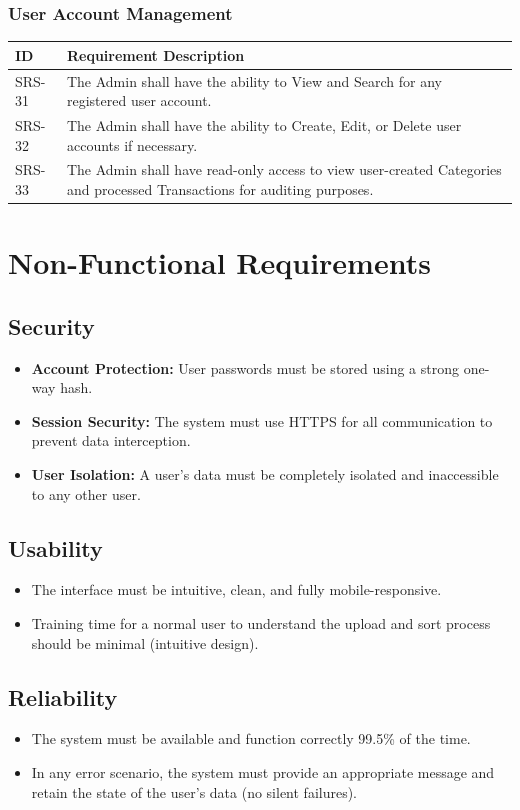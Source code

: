 \documentclass[11pt,a4paper]{report}
\begin{document}
\subsubsection{User Account Management}
\begin{longtable}{|p{2.5cm}|p{12cm}|}
	\hline
	\textbf{ID} & \textbf{Requirement Description} \\
	\hline
	SRS-31 & The Admin shall have the ability to View and Search for any registered user account. \\ \hline
	SRS-32 & The Admin shall have the ability to Create, Edit, or Delete user accounts if necessary. \\ \hline
	SRS-33 & The Admin shall have read-only access to view user-created Categories and processed Transactions for auditing purposes. \\ \hline
\end{longtable}

\section{Non-Functional Requirements}

\subsection{Security}
\begin{itemize}
	\item \textbf{Account Protection:} User passwords must be stored using a strong one-way hash.
	\item \textbf{Session Security:} The system must use HTTPS for all communication to prevent data interception.
	\item \textbf{User Isolation:} A user's data must be completely isolated and inaccessible to any other user.
\end{itemize}

\subsection{Usability}
\begin{itemize}
	\item The interface must be intuitive, clean, and fully mobile-responsive.
	\item Training time for a normal user to understand the upload and sort process should be minimal (intuitive design).
\end{itemize}

\subsection{Reliability}
\begin{itemize}
	\item The system must be available and function correctly 99.5\% of the time.
	\item In any error scenario, the system must provide an appropriate message and retain the state of the user's data (no silent failures).
\end{itemize}
\end{document}
